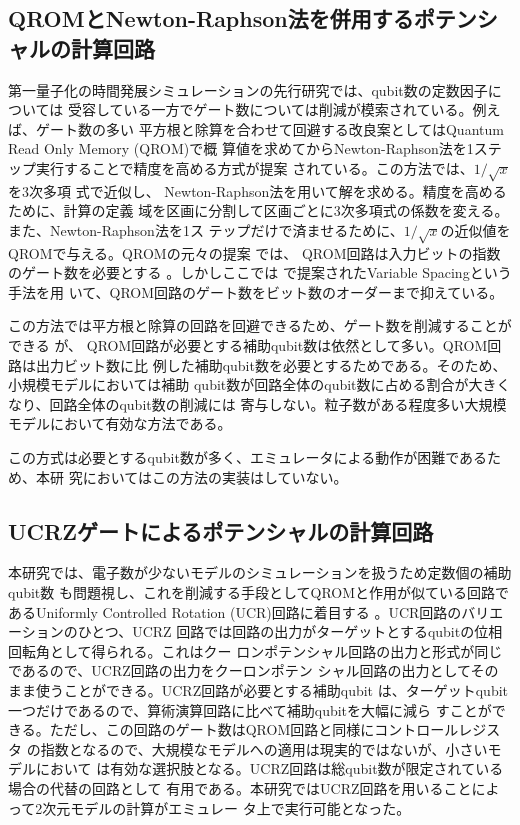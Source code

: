 \documentclass[fontsize=11pt]{jlreq}
\begin{document}
\subsection{QROMとNewton-Raphson法を併用するポテンシャルの計算回路}
\label{subsec:potential-circuit-by-qrom-newton-raphson}

第一量子化の時間発展シミュレーションの先行研究では、qubit数の定数因子については
受容している一方でゲート数については削減が模索されている。例えば、ゲート数の多い
平方根と除算を合わせて回避する改良案としてはQuantum Read Only Memory (QROM)で概
算値を求めてからNewton-Raphson法を1ステップ実行することで精度を高める方式が提案
されている\cite{Rubin2024.pnas.2317772121}。この方法では、$1/\sqrt{x}$を3次多項
式で近似し、 Newton-Raphson法を用いて解を求める。精度を高めるために、計算の定義
域を区画に分割して区画ごとに3次多項式の係数を変える。また、Newton-Raphson法を1ス
テップだけで済ませるために、$1/\sqrt{x}$の近似値をQROMで与える。QROMの元々の提案
では、 QROM回路は入力ビットの指数のゲート数を必要とする
\cite{Babbush_2018b.PhysRevX.8.041015}。しかしここでは
\cite{Sanders2020.PRXQuantum.1.020312}で提案されたVariable Spacingという手法を用
いて、QROM回路のゲート数をビット数のオーダーまで抑えている。

この方法では平方根と除算の回路を回避できるため、ゲート数を削減することができる
が、 QROM回路が必要とする補助qubit数は依然として多い。QROM回路は出力ビット数に比
例した補助qubit数を必要とするためである。そのため、小規模モデルにおいては補助
qubit数が回路全体のqubit数に占める割合が大きくなり、回路全体のqubit数の削減には
寄与しない。粒子数がある程度多い大規模モデルにおいて有効な方法である。

この方式は必要とするqubit数が多く、エミュレータによる動作が困難であるため、本研
究においてはこの方法の実装はしていない。

\subsection{UCRZゲートによるポテンシャルの計算回路}
\label{subsec:potential-circuit-by-ucrz-qubits}

本研究では、電子数が少ないモデルのシミュレーションを扱うため定数個の補助qubit数
も問題視し、これを削減する手段としてQROMと作用が似ている回路であるUniformly
Controlled Rotation (UCR)回路に着目する
\cite{Mottonen2004.PhysRevLett.93.130502}。UCR回路のバリエーションのひとつ、UCRZ
回路では回路の出力がターゲットとするqubitの位相回転角として得られる。これはクー
ロンポテンシャル回路の出力と形式が同じであるので、UCRZ回路の出力をクーロンポテン
シャル回路の出力としてそのまま使うことができる。UCRZ回路が必要とする補助qubit
は、ターゲットqubit一つだけであるので、算術演算回路に比べて補助qubitを大幅に減ら
すことができる。ただし、この回路のゲート数はQROM回路と同様にコントロールレジスタ
の指数となるので、大規模なモデルへの適用は現実的ではないが、小さいモデルにおいて
は有効な選択肢となる。UCRZ回路は総qubit数が限定されている場合の代替の回路として
有用である。本研究ではUCRZ回路を用いることによって2次元モデルの計算がエミュレー
タ上で実行可能となった。
\end{document}
